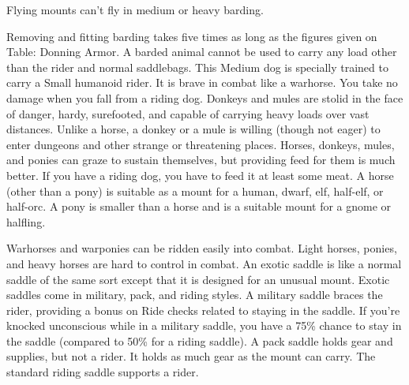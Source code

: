 \par Flying mounts can't fly in medium or heavy barding.
\par Removing and fitting barding takes five times as long as the figures given on Table: Donning Armor. A barded animal cannot be used to carry any load other than the rider and normal saddlebags.
 This Medium dog is specially trained to carry a Small humanoid rider. It is brave in combat like a warhorse. You take no damage when you fall from a riding dog.
 Donkeys and mules are stolid in the face of danger, hardy, surefooted, and capable of carrying heavy loads over vast distances. Unlike a horse, a donkey or a mule is willing (though not eager) to enter dungeons and other strange or threatening places.
 Horses, donkeys, mules, and ponies can graze to sustain themselves, but providing feed for them is much better. If you have a riding dog, you have to feed it at least some meat.
 A horse (other than a pony) is suitable as a mount for a human, dwarf, elf, half-elf, or half-orc. A pony is smaller than a horse and is a suitable mount for a gnome or halfling.
\par Warhorses and warponies can be ridden easily into combat. Light horses, ponies, and heavy horses are hard to control in combat.
 An exotic saddle is like a normal saddle of the same sort except that it is designed for an unusual mount. Exotic saddles come in military, pack, and riding styles.
 A military saddle braces the rider, providing a  bonus on Ride checks related to staying in the saddle. If you're knocked unconscious while in a military saddle, you have a 75\% chance to stay in the saddle (compared to 50\% for a riding saddle).
 A pack saddle holds gear and supplies, but not a rider. It holds as much gear as the mount can carry.
 The standard riding saddle supports a rider.

